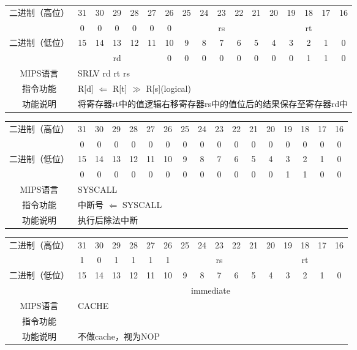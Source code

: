 \begin{table}
\begin{tabular}{|c|c|c|c|c|c|c|c|c|c|c|c|c|c|c|c|c|}
\hline
\multirow{2}{*}{二进制（高位）} &
31&30&29&28&27&26&25&24&23&22&21&20&19&18&17&16\\
\cline{2-17}
&
0&0&0&0&0&
0&
\multicolumn{5}{c|}{rs}&
\multicolumn{5}{c|}{rt}\\
\hline
\multirow{2}{*}{二进制（低位）} &
15&14&13&12&11&10&9&8&7&6&5&4&3&2&1&0\\
\cline{2-17}
&
\multicolumn{5}{c|}{rd} &
0&0&0&0&0&
0&0&0&1&1&
0\\
\hline
MIPS语言&
\multicolumn{16}{l|}{SRLV rd rt rs}\\
\hline
指令功能&
\multicolumn{16}{l|}{R[d] $\Leftarrow$ R[t] $\gg$ R[s](logical)}\\
\hline
功能说明&
\multicolumn{16}{l|}{将寄存器rt中的值逻辑右移寄存器rs中的值位后的结果保存至寄存器rd中}\\
\hline
\end{tabular}
\end{table}

\clearpage

\begin{table}
\begin{tabular}{|c|c|c|c|c|c|c|c|c|c|c|c|c|c|c|c|c|}
\hline
\multirow{2}{*}{二进制（高位）} &
31&30&29&28&27&26&25&24&23&22&21&20&19&18&17&16\\
\cline{2-17}
&
0&0&0&0&0&
0&0&0&0&0&
0&0&0&0&0&
0\\
\hline
\multirow{2}{*}{二进制（低位）} &
15&14&13&12&11&10&9&8&7&6&5&4&3&2&1&0\\
\cline{2-17}
&
0&0&0&0&0&
0&0&0&0&0&
0&0&1&1&0&
0\\
\hline
MIPS语言&
\multicolumn{16}{l|}{SYSCALL}\\
\hline
指令功能&
\multicolumn{16}{l|}{中断号 $\Leftarrow$ SYSCALL}\\
\hline
功能说明&
\multicolumn{16}{l|}{执行后除法中断}\\
\hline
\end{tabular}
\end{table}

\begin{table}
\begin{tabular}{|c|c|c|c|c|c|c|c|c|c|c|c|c|c|c|c|c|}
\hline
\multirow{2}{*}{二进制（高位）} &
31&30&29&28&27&26&25&24&23&22&21&20&19&18&17&16\\
\cline{2-17}
&
1&0&1&1&1&
1&
\multicolumn{5}{c|}{rs}&
\multicolumn{5}{c|}{rt}\\
\hline
\multirow{2}{*}{二进制（低位）} &
15&14&13&12&11&10&9&8&7&6&5&4&3&2&1&0\\
\cline{2-17}
&
\multicolumn{16}{c|}{immediate}\\
\hline
MIPS语言&
\multicolumn{16}{l|}{CACHE}\\
\hline
指令功能&
\multicolumn{16}{l|}{}\\
\hline
功能说明&
\multicolumn{16}{l|}{不做cache，视为NOP}\\
\hline
\end{tabular}
\end{table}

